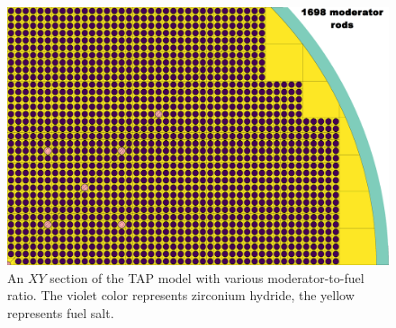 \begin{frame}
\begin{textblock*}{12.6cm}
\begin{figure}[htp!]
\begin{overprint}
		\centerline{\includegraphics[height=0.75\textheight]{./images/1668.png}}
	\end{overprint}
	\caption{An $XY$ section of the \gls{TAP} model with various 
	moderator-to-fuel ratio. The violet color represents zirconium hydride, 
	the yellow represents fuel 
		salt.}
\end{figure}
\end{textblock*}
\end{frame}



